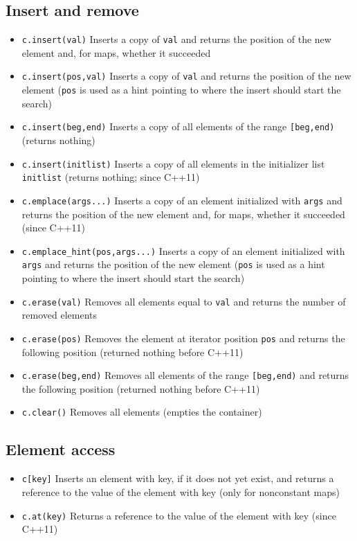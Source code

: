 \documentclass{report}
\begin{document}
\subsection{Insert and remove}
\begin{itemize}
    \item \texttt{c.insert(val)} Inserts a copy of \texttt{val} and returns the position of the new element and, for maps, whether it succeeded
    \item \texttt{c.insert(pos,val)} Inserts a copy of \texttt{val} and returns the position of the new element (\texttt{pos} is used as a hint pointing to where the insert should start the search)
    \item \texttt{c.insert(beg,end)} Inserts a copy of all elements of the range \texttt{[beg,end)} (returns nothing)
    \item \texttt{c.insert(initlist)} Inserts a copy of all elements in the initializer list \texttt{initlist} (returns nothing; since C++11)
    \item \texttt{c.emplace(args...)} Inserts a copy of an element initialized with \texttt{args} and returns the position of the new element and, for maps, whether it succeeded (since C++11)
    \item \texttt{c.emplace\_hint(pos,args...)} Inserts a copy of an element initialized with \texttt{args} and returns the position of the new element (\texttt{pos} is used as a hint pointing to where the insert should start the search)
    \item \texttt{c.erase(val)} Removes all elements equal to \texttt{val} and returns the number of removed elements
    \item \texttt{c.erase(pos)} Removes the element at iterator position \texttt{pos} and returns the following position (returned nothing before C++11)
    \item \texttt{c.erase(beg,end)} Removes all elements of the range \texttt{[beg,end)} and returns the following position (returned nothing before C++11)
    \item \texttt{c.clear()} Removes all elements (empties the container)
\end{itemize}

\bigbreak \noindent 
\subsection{Element access}
\begin{itemize}
    \item \texttt{c[key]} Inserts an element with key, if it does not yet exist, and returns a reference to the value of the element with key (only for nonconstant maps)
    \item \texttt{c.at(key)} Returns a reference to the value of the element with key (since C++11)
\end{itemize}
\end{document}
